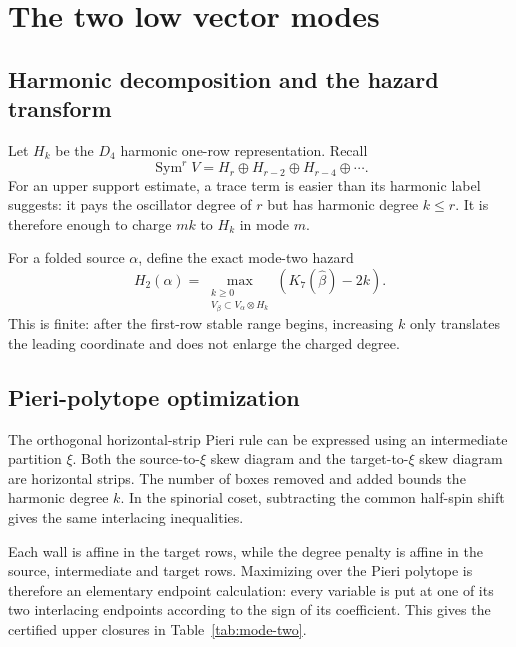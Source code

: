 \documentclass[11pt,a4paper]{article}
\theoremstyle{definition}
\newcommand{\Kseven}{K_{7}}
\begin{document}
\section{The two low vector modes}

\subsection{Harmonic decomposition and the hazard transform}

Let $H_k$ be the $D_4$ harmonic one-row representation.  Recall
\[
   \operatorname{Sym}^{r}V
   =H_r\oplus H_{r-2}\oplus H_{r-4}\oplus\cdots.
\]
For an upper support estimate, a trace term is easier than its harmonic
label suggests: it pays the oscillator degree of $r$ but has harmonic degree
$k\leq r$.  It is therefore enough to charge $mk$ to $H_k$ in mode $m$.

For a folded source $\alpha$, define the exact mode-two hazard
\[
 H_2(\alpha)=
 \max_{\substack{k\geq0\\V_\beta\subset V_\alpha\otimes H_k}}
 \left(\Kseven(\widehat\beta)-2k\right).
\]
This is finite: after the first-row stable range begins, increasing $k$ only
translates the leading coordinate and does not enlarge the charged degree.

\subsection{Pieri-polytope optimization}

The orthogonal horizontal-strip Pieri rule can be expressed using an
intermediate partition $\xi$.  Both the source-to-$\xi$ skew diagram and the
target-to-$\xi$ skew diagram are horizontal strips.  The number of boxes
removed and added bounds the harmonic degree $k$.  In the spinorial coset,
subtracting the common half-spin shift gives the same interlacing
inequalities.

Each wall is affine in the target rows, while the degree penalty is affine in
the source, intermediate and target rows.  Maximizing over the Pieri polytope
is therefore an elementary endpoint calculation: every variable is put at
one of its two interlacing endpoints according to the sign of its coefficient.
This gives the certified upper closures in
Table~\ref{tab:mode-two}.
\end{document}
